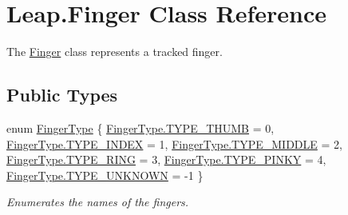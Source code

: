 \hypertarget{class_leap_1_1_finger}{}\section{Leap.\+Finger Class Reference}
\label{class_leap_1_1_finger}


The \mbox{\hyperlink{class_leap_1_1_finger}{Finger}} class represents a tracked finger.  


\subsection*{Public Types}
\begin{DoxyCompactItemize}
\item 
enum \mbox{\hyperlink{class_leap_1_1_finger_ae75e8d46a01aff0bd5c6d6fb99e2f2ba}{Finger\+Type}} \{ \newline
\mbox{\hyperlink{class_leap_1_1_finger_ae75e8d46a01aff0bd5c6d6fb99e2f2baa80b1befb870616449c53c8e69bc07216}{Finger\+Type.\+T\+Y\+P\+E\+\_\+\+T\+H\+U\+MB}} = 0, 
\mbox{\hyperlink{class_leap_1_1_finger_ae75e8d46a01aff0bd5c6d6fb99e2f2baae935a2bcf041187b5d3530f6084c5914}{Finger\+Type.\+T\+Y\+P\+E\+\_\+\+I\+N\+D\+EX}} = 1, 
\mbox{\hyperlink{class_leap_1_1_finger_ae75e8d46a01aff0bd5c6d6fb99e2f2baa965f716c4f07774bf9ac423d8806e43f}{Finger\+Type.\+T\+Y\+P\+E\+\_\+\+M\+I\+D\+D\+LE}} = 2, 
\mbox{\hyperlink{class_leap_1_1_finger_ae75e8d46a01aff0bd5c6d6fb99e2f2baa713f93a2e06469cbe78206cf744b9966}{Finger\+Type.\+T\+Y\+P\+E\+\_\+\+R\+I\+NG}} = 3, 
\newline
\mbox{\hyperlink{class_leap_1_1_finger_ae75e8d46a01aff0bd5c6d6fb99e2f2baab9f37692a6cb1524fc97cedc5bac23a5}{Finger\+Type.\+T\+Y\+P\+E\+\_\+\+P\+I\+N\+KY}} = 4, 
\mbox{\hyperlink{class_leap_1_1_finger_ae75e8d46a01aff0bd5c6d6fb99e2f2baacc25e6802810879f48a8f1f6dff41a81}{Finger\+Type.\+T\+Y\+P\+E\+\_\+\+U\+N\+K\+N\+O\+WN}} = -\/1
 \}
\begin{DoxyCompactList}\small\item\em Enumerates the names of the fingers. \end{DoxyCompactList}\end{DoxyCompactItemize}
